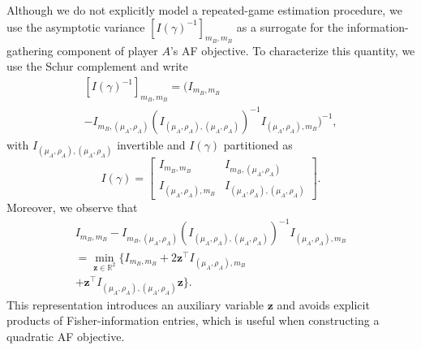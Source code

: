\documentclass[letterpaper, 10 pt, conference]{ieeeconf}
\newcommand{\R}{\mathbb R}
\newcommand{\transpose}{^\mathsf{T}}
\begin{document}
Although we do not explicitly model a repeated-game estimation procedure, we use the asymptotic variance \([I(\gamma)^{-1}]_{m_B,m_B}\) as a surrogate for the information-gathering component of player \(A\)'s AF objective. To characterize this quantity, we use the Schur complement and write
 \begin{multline}\label{eq:Schur}
    [I(\gamma)^{-1}]_{m_B,m_B} = \bigl(I_{m_B,m_B} \\ - I_{m_B,(\mu_A,\rho_A)} (I_{(\mu_A,\rho_A),(\mu_A,\rho_A)})^{-1} I_{(\mu_A,\rho_A),m_B}\bigr)^{-1},
\end{multline}
with $I_{(\mu_A,\rho_A),(\mu_A,\rho_A)}$ invertible and $I(\gamma)$ partitioned as
\begin{equation*}%
    I(\gamma) = \begin{bmatrix}
        I_{m_B, m_B} & I_{m_B, (\mu_A, \rho_A)} \\
        I_{(\mu_A, \rho_A), m_B} & I_{(\mu_A, \rho_A), (\mu_A, \rho_A)}
    \end{bmatrix}.
\end{equation*}
Moreover, we observe that
\begin{multline}\label{eq:variational}
I_{m_B,m_B}
-
I_{m_B,(\mu_A,\rho_A)}
(I_{(\mu_A,\rho_A),(\mu_A,\rho_A)})^{-1}
I_{(\mu_A,\rho_A),m_B}\\
=
\min_{\bm z\in\mathbb R^2}
\big\{
I_{m_B,m_B}
+
2\bm z^\top I_{(\mu_A,\rho_A),m_B}
\\+
\bm z^\top I_{(\mu_A,\rho_A),(\mu_A,\rho_A)}\bm z
\big\}.
\end{multline}
This representation introduces an auxiliary variable \(\bm z\) and avoids explicit products of Fisher-information entries, which is useful when constructing a quadratic AF objective.





\end{document}
